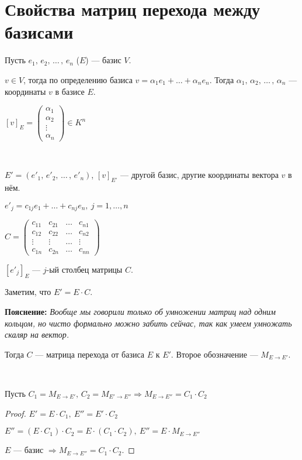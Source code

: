 \section{Свойства матриц перехода между базисами}

\begin{conj} 
    
    Пусть $e_1,\, e_2,\, \dots\, ,\, e_n$ ($E$) --- базис $V$. 
    
    $v \in V$, тогда по определению базиса $v = \alpha_1 e_1 + \dots + \alpha_n e_n$. 
    Тогда $\alpha_1,\, \alpha_2,\, \dots\, ,\, \alpha_n$ --- координаты $v$ в базисе $E$.

    $[v]_E =
        \begin{pmatrix}
            \alpha_1\\
            \alpha_2\\
            \vdots\\
            \alpha_n
        \end{pmatrix}
    \in K^n$
\end{conj}
\
\begin{conj}


    $E' = (e'_1,\, e'_2,\, \dots\, ,\, e'_n)$, $[v]_{E'}$ --- другой базис, другие координаты вектора $v$ в нём.

    $e'_j = c_{1j}e_1 + \dots + c_{nj}e_n,\ j = 1, \dots, n$

    $C =
        \begin{pmatrix}
            c_{11} & c_{21} & \dots & c_{n1} \\
            c_{12} & c_{22} & \dots & c_{n2} \\
            \vdots & \vdots & \dots & \vdots \\
            c_{1n} & c_{2n} & \dots & c_{nn}
        \end{pmatrix}
    $

    $[e'_j]_E$ --- $j$-ый столбец матрицы $C$.

    Заметим, что $E' = E \cdot C$.


    \textbf{Пояснение:}
    \emph{Вообще мы говорили только об умножении матриц над одним кольцом, 
    но чисто формально можно забить сейчас, так как умеем умножать скаляр на вектор.}

    Тогда $C$ --- матрица перехода от базиса $E$ к $E'$. Второе обозначение --- $M_{E \to E'}$.


\end{conj}
\
\begin{theorem-non} 
    
    Пусть $C_1 = M_{E \to E'}, \, C_2 = M_{E' \to E''} \Longrightarrow M_{E \to E''} = C_1 \cdot C_2$
    \begin{proof}
        
        $E' = E \cdot C_1, \  E'' = E' \cdot C_2$ 

        $E'' = (E \cdot C_1) \cdot C_2 = E \cdot (C_1 \cdot C_2), \  E'' = E \cdot M_{E \to E''}$

        $E$ --- базис $\Longrightarrow M_{E \to E''} = C_1 \cdot C_2$.
    \end{proof}
\end{theorem-non}

